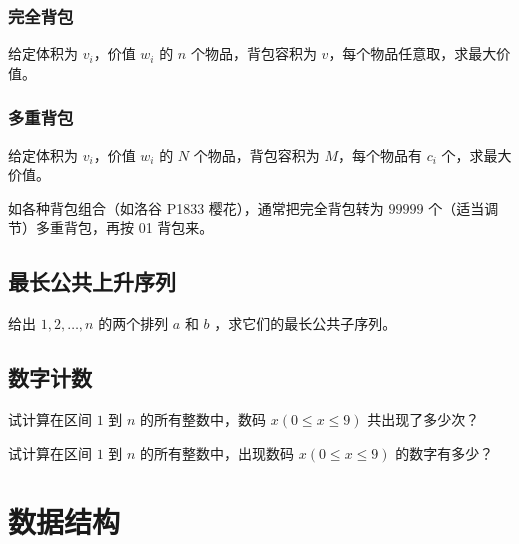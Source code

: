 \documentclass{probook}
\begin{document}
\begin{multicols}{2}
\subsection{完全背包}

给定体积为 $v_i$，价值 $w_i$ 的 $n$ 个物品，背包容积为 $v$，每个物品任意取，求最大价值。



\subsection{多重背包}

给定体积为 $v_i$，价值 $w_i$ 的 $N$ 个物品，背包容积为 $M$，每个物品有 $c_i$ 个，求最大价值。

如各种背包组合（如洛谷 P1833 樱花），通常把完全背包转为 $99999$ 个（适当调节）多重背包，再按 01 背包来。



\section{最长公共上升序列}

给出 $1,2,\ldots,n$ 的两个排列 $a$ 和 $b$ ，求它们的最长公共子序列。



\section{数字计数}

试计算在区间 $1$ 到 $n$ 的所有整数中，数码 $x(0 \leqslant x \leqslant 9)$ 共出现了多少次？



试计算在区间 $1$ 到 $n$ 的所有整数中，出现数码 $x(0 \leqslant x \leqslant 9)$ 的数字有多少？









\chapter{数据结构}


\end{multicols}
\end{document}
